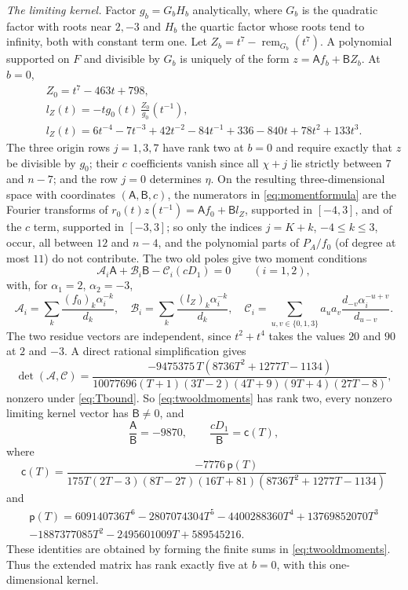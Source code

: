 \documentclass{amsart}
\theoremstyle{definition}
\theoremstyle{remark}
\numberwithin{equation}{section}
\begin{document}
\emph{The limiting kernel.} Factor $g_b=G_bH_b$ analytically, where $G_b$ is the
quadratic factor with roots near $2,-3$ and $H_b$ the quartic factor whose roots tend to
infinity, both with constant term one. Let $Z_b=t^7-\operatorname{rem}_{G_b}(t^7)$.
A polynomial supported on $F$ and divisible by $G_b$ is uniquely of the form
$z=\mathsf A f_b+\mathsf B Z_b$. At $b=0$,
\begin{gather*}
  Z_0=t^7-463t+798,\\
  l_Z(t)=-tg_0(t)\,\frac{Z_0}{g_0}(t^{-1}),\\
  l_Z(t)=6t^{-4}-7t^{-3}+42t^{-2}-84t^{-1}+336-840t+78t^2+133t^3 .
\end{gather*}
The three origin rows $j=1,3,7$ have rank two at $b=0$ and require exactly that $z$
be divisible by $g_0$; their $c$ coefficients vanish since all $\chi+j$ lie strictly
between $7$ and $n-7$; and the row $j=0$ determines $\eta$. On the resulting
three-dimensional space with coordinates $(\mathsf A,\mathsf B,c)$, the numerators in
\eqref{eq:momentformula} are the Fourier transforms of $r_0(t)z(t^{-1})=\mathsf Af_0+
\mathsf Bl_Z$, supported in $[-4,3]$, and of the $c$ term, supported in $[-3,3]$; so only
the indices $j=K+k$, $-4\le k\le3$, occur, all between $12$ and $n-4$, and the
polynomial parts of $P_A/f_0$ (of degree at most $11$) do not contribute. The two old
poles give two moment conditions
\begin{equation}\label{eq:twooldmoments}
  \mathcal A_i\mathsf A+\mathcal B_i\mathsf B-\mathcal C_i(cD_1)=0\qquad(i=1,2),
\end{equation}
with, for $\alpha_1=2$, $\alpha_2=-3$,
\[
  \mathcal A_i=\sum_k\frac{(f_0)_k\alpha_i^{-k}}{d_k},\quad
  \mathcal B_i=\sum_k\frac{(l_Z)_k\alpha_i^{-k}}{d_k},\quad
  \mathcal C_i=\sum_{u,v\in\{0,1,3\}}a_ua_v\frac{d_{-v}\alpha_i^{-u+v}}{d_{u-v}} .
\]
The two residue vectors are independent, since $t^2+t^4$ takes the values $20$ and
$90$ at $2$ and $-3$. A direct rational simplification gives
\begin{equation}\label{eq:DAC}
  \det(\mathcal A,\mathcal C)=\frac{-9475375\,T(8736T^2+1277T-1134)}
  {10077696(T+1)(3T-2)(4T+9)(9T+4)(27T-8)},
\end{equation}
nonzero under \eqref{eq:Tbound}. So \eqref{eq:twooldmoments} has rank two, every
nonzero limiting kernel vector has $\mathsf B\ne0$, and
\begin{equation}\label{eq:limkernel}
  \frac{\mathsf A}{\mathsf B}=-9870,\qquad \frac{cD_1}{\mathsf B}=\mathsf c(T),
\end{equation}
where
\[
  \mathsf c(T)=\frac{-7776\,\mathsf p(T)}{175T(2T-3)(8T-27)(16T+81)(8736T^2+1277T-1134)}
\]
and
\begin{multline*}
  \mathsf p(T)=609140736T^6-2807074304T^5-4400288360T^4+13769852070T^3\\
  -1887377085T^2-2495601009T+589545216 .
\end{multline*}
These identities are obtained by forming the finite sums in \eqref{eq:twooldmoments}.
Thus the extended matrix has rank exactly five at $b=0$, with this one-dimensional
kernel.
\end{document}
